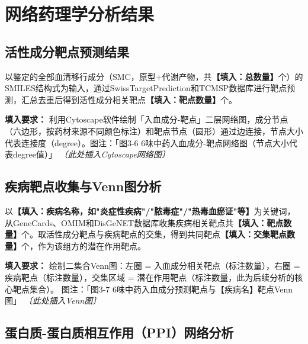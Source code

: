 \documentclass[12pt,a4paper,UTF8,openany]{ctexbook}
\begin{document}
\section{网络药理学分析结果}

\subsection{活性成分靶点预测结果}

以鉴定的全部血清移行成分（SMC，原型+代谢产物，共\textbf{【填入：总数量】}个）的SMILES结构式为输入，通过SwissTargetPrediction和TCMSP数据库进行靶点预测，汇总去重后得到活性成分相关靶点\textbf{【填入：靶点数量】}个。

\begin{tcolorbox}[colback=orange!5!white,colframe=orange!60!black,title={\textbf{【待填入】图3-6：活性成分-靶点网络图}},fonttitle=\small\bfseries]
\textbf{填入要求：}
利用Cytoscape软件绘制「入血成分-靶点」二层网络图，成分节点（六边形，按药材来源不同颜色标注）和靶点节点（圆形）通过边连接，节点大小代表连接度（degree）。图注：「图3-6 6味中药入血成分-靶点网络图（节点大小代表degree值）」
\textit{〔此处插入Cytoscape网络图〕}
\end{tcolorbox}

\subsection{疾病靶点收集与Venn图分析}

以\textbf{【填入：疾病名称，如"炎症性疾病"/"脓毒症"/"热毒血瘀证"等】}为关键词，从GeneCards、OMIM和DisGeNET数据库收集疾病相关靶点共\textbf{【填入：靶点数量】}个。取活性成分靶点与疾病靶点的交集，得到共同靶点\textbf{【填入：交集靶点数量】}个，作为该组方的潜在作用靶点。

\begin{tcolorbox}[colback=orange!5!white,colframe=orange!60!black,title={\textbf{【待填入】图3-7：Venn图——入血成分靶点与疾病靶点交集}},fonttitle=\small\bfseries]
\textbf{填入要求：}
绘制二集合Venn图：左圈 = 入血成分相关靶点（标注数量），右圈 = 疾病靶点（标注数量），交集区域 = 潜在作用靶点（标注数量，此为后续分析的核心靶点集合）。
图注：「图3-7 6味中药入血成分预测靶点与【疾病名】靶点Venn图」
\textit{〔此处插入Venn图〕}
\end{tcolorbox}

\subsection{蛋白质-蛋白质相互作用（PPI）网络分析}
\end{document}
